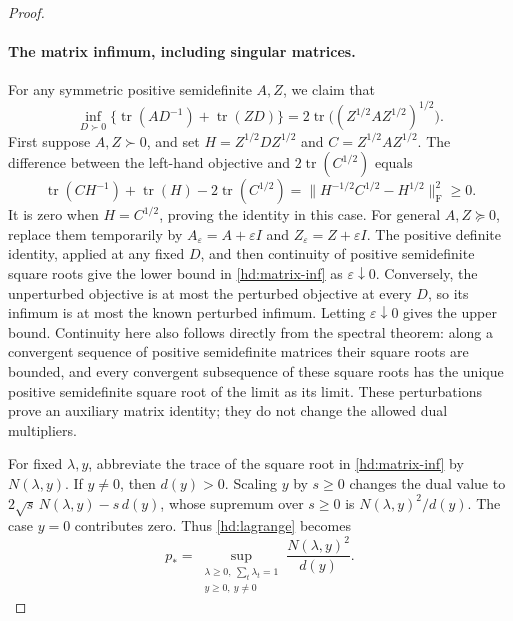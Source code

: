 \documentclass[11pt]{amsart}
\theoremstyle{definition}
\theoremstyle{remark}
\numberwithin{equation}{section}
\begin{document}
\begin{proof}
\paragraph{The matrix infimum, including singular matrices.}
For any symmetric positive semidefinite $A,Z$, we claim that
\begin{equation}
\label{hd:matrix-inf}
 \inf_{D\succ0}
 \bigl\{\operatorname{tr}(AD^{-1})+\operatorname{tr}(ZD)\bigr\}
 =2\operatorname{tr}\bigl((Z^{1/2}AZ^{1/2})^{1/2}\bigr).
\end{equation}
First suppose $A,Z\succ0$, and set
$H=Z^{1/2}DZ^{1/2}$ and $C=Z^{1/2}AZ^{1/2}$.  The difference between
the left-hand objective and $2\operatorname{tr}(C^{1/2})$ equals
\[
 \operatorname{tr}(CH^{-1})+\operatorname{tr}(H)
       -2\operatorname{tr}(C^{1/2})
   =\|H^{-1/2}C^{1/2}-H^{1/2}\|_{\mathrm F}^2\geq0.
\]
It is zero when $H=C^{1/2}$, proving the identity in this case.
For general $A,Z\succeq0$, replace them temporarily by
$A_\varepsilon=A+\varepsilon I$ and
$Z_\varepsilon=Z+\varepsilon I$.  The positive definite identity,
applied at any fixed $D$, and then continuity of positive semidefinite
square roots give the lower bound in \eqref{hd:matrix-inf} as
$\varepsilon\downarrow0$.  Conversely, the unperturbed objective is
at most the perturbed objective at every $D$, so its infimum is at
most the known perturbed infimum.  Letting $\varepsilon\downarrow0$
gives the upper bound.  Continuity here also follows directly from the
spectral theorem: along a convergent sequence of positive semidefinite
matrices their square roots are bounded, and every convergent
subsequence of these square roots has the unique positive
semidefinite square root of the limit as its limit.  These
perturbations prove an auxiliary matrix identity; they do not change
the allowed dual multipliers.

For fixed $\lambda,y$, abbreviate the trace of the square root in
\eqref{hd:matrix-inf} by $N(\lambda,y)$.  If $y\ne0$, then $d(y)>0$.
Scaling $y$ by $s\geq0$ changes the dual value to
$2\sqrt{s}\,N(\lambda,y)-s\,d(y)$, whose supremum over $s\geq0$ is
$N(\lambda,y)^2/d(y)$.  The case $y=0$ contributes zero.  Thus
\eqref{hd:lagrange} becomes
\begin{equation}
\label{hd:homogeneous}
 p_*=
 \sup_{\substack{\lambda\geq0,\ \sum_t\lambda_t=1\\y\geq0,\ y\ne0}}
 \frac{N(\lambda,y)^2}{d(y)}.
\end{equation}


\end{proof}
\end{document}
